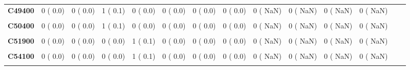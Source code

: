 \documentclass[
]{article}
\begin{document}
\begin{table}[H]
\begin{tabular}[t]{>{\raggedright\arraybackslash}p{5em}ccccccccccccc}
\textbf{C49400} & 0 (  0.0) & 0 (  0.0) & 1 (  0.1) & 0 (  0.0) & 0 (  0.0) & 0 (  0.0) & 0 (  0.0) & 0 (  NaN) & 0 (  NaN) & 0 (  NaN) & 0 (  NaN) &  & \\
\textbf{\cellcolor{gray!10}{C49900}} & \cellcolor{gray!10}{1 (  0.1)} & \cellcolor{gray!10}{0 (  0.0)} & \cellcolor{gray!10}{0 (  0.0)} & \cellcolor{gray!10}{0 (  0.0)} & \cellcolor{gray!10}{0 (  0.0)} & \cellcolor{gray!10}{0 (  0.0)} & \cellcolor{gray!10}{0 (  0.0)} & \cellcolor{gray!10}{0 (  NaN)} & \cellcolor{gray!10}{0 (  NaN)} & \cellcolor{gray!10}{0 (  NaN)} & \cellcolor{gray!10}{0 (  NaN)} & \cellcolor{gray!10}{} & \cellcolor{gray!10}{}\\
\textbf{C50400} & 0 (  0.0) & 0 (  0.0) & 1 (  0.1) & 0 (  0.0) & 0 (  0.0) & 0 (  0.0) & 0 (  0.0) & 0 (  NaN) & 0 (  NaN) & 0 (  NaN) & 0 (  NaN) &  & \\
\textbf{\cellcolor{gray!10}{C50900}} & \cellcolor{gray!10}{6 (  0.7)} & \cellcolor{gray!10}{2 (  0.2)} & \cellcolor{gray!10}{7 (  0.8)} & \cellcolor{gray!10}{5 (  0.7)} & \cellcolor{gray!10}{2 (  0.4)} & \cellcolor{gray!10}{3 (  1.1)} & \cellcolor{gray!10}{1 (  0.4)} & \cellcolor{gray!10}{0 (  NaN)} & \cellcolor{gray!10}{0 (  NaN)} & \cellcolor{gray!10}{0 (  NaN)} & \cellcolor{gray!10}{0 (  NaN)} & \cellcolor{gray!10}{} & \cellcolor{gray!10}{}\\
\textbf{C51900} & 0 (  0.0) & 0 (  0.0) & 0 (  0.0) & 1 (  0.1) & 0 (  0.0) & 0 (  0.0) & 0 (  0.0) & 0 (  NaN) & 0 (  NaN) & 0 (  NaN) & 0 (  NaN) &  & \\
\textbf{\cellcolor{gray!10}{C53900}} & \cellcolor{gray!10}{0 (  0.0)} & \cellcolor{gray!10}{1 (  0.1)} & \cellcolor{gray!10}{0 (  0.0)} & \cellcolor{gray!10}{0 (  0.0)} & \cellcolor{gray!10}{0 (  0.0)} & \cellcolor{gray!10}{0 (  0.0)} & \cellcolor{gray!10}{1 (  0.4)} & \cellcolor{gray!10}{0 (  NaN)} & \cellcolor{gray!10}{0 (  NaN)} & \cellcolor{gray!10}{0 (  NaN)} & \cellcolor{gray!10}{0 (  NaN)} & \cellcolor{gray!10}{} & \cellcolor{gray!10}{}\\
\textbf{C54100} & 0 (  0.0) & 0 (  0.0) & 0 (  0.0) & 1 (  0.1) & 0 (  0.0) & 0 (  0.0) & 0 (  0.0) & 0 (  NaN) & 0 (  NaN) & 0 (  NaN) & 0 (  NaN) &  & \\
\textbf{\cellcolor{gray!10}{C55000}} & \cellcolor{gray!10}{0 (  0.0)} & \cellcolor{gray!10}{0 (  0.0)} & \cellcolor{gray!10}{0 (  0.0)} & \cellcolor{gray!10}{1 (  0.1)} & \cellcolor{gray!10}{1 (  0.2)} & \cellcolor{gray!10}{1 (  0.4)} & \cellcolor{gray!10}{0 (  0.0)} & \cellcolor{gray!10}{0 (  NaN)} & \cellcolor{gray!10}{0 (  NaN)} & \cellcolor{gray!10}{0 (  NaN)} & \cellcolor{gray!10}{0 (  NaN)} & \cellcolor{gray!10}{} & \cellcolor{gray!10}{}\\

\end{tabular}
\end{table}
\end{document}
